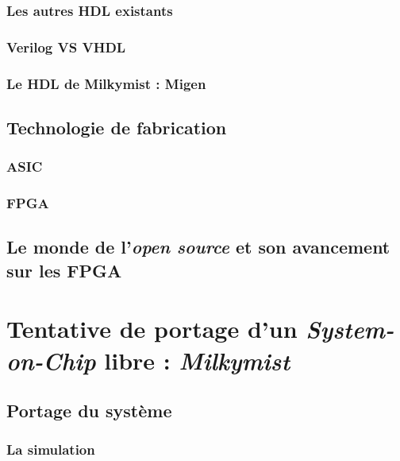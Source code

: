 \documentclass[a4paper]{report}
\begin{document}
\subsection{Les autres HDL existants}
 \newpage

\subsection{Verilog VS VHDL}
 \newpage

\subsection{Le HDL de Milkymist : Migen}
 \newpage

\section{Technologie de fabrication}

\subsection{ASIC}
 \newpage

\subsection{FPGA}
 \newpage

\section{Le monde de l'\textit{open source} et son avancement sur les FPGA}
 \newpage

\chapter{Tentative de portage d'un \textit{System-on-Chip} libre : \textit{Milkymist}}
\newpage

\section{Portage du système}

\subsection{La simulation}
 \newpage
\end{document}
